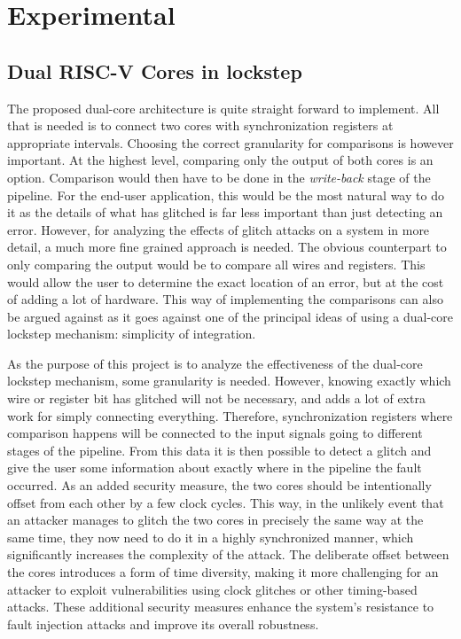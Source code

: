 \chapter{Experimental}
\label{chap4}

\section{Dual RISC-V Cores in lockstep}
\label{sec:dualcore}

The proposed dual-core architecture is quite straight forward to implement. All that is needed is to connect two cores with synchronization registers at appropriate intervals. Choosing the correct granularity for comparisons is however important. At the highest level, comparing only the output of both cores is an option. Comparison would then have to be done in the \textit{write-back} stage of the pipeline. For the end-user application, this would be the most natural way to do it as the details of what has glitched is far less important than just detecting an error. However, for analyzing the effects of glitch attacks on a system in more detail, a much more fine grained approach is needed. The obvious counterpart to only comparing the output would be to compare all wires and registers. This would allow the user to determine the exact location of an error, but at the cost of adding a lot of hardware. This way of implementing the comparisons can also be argued against as it goes against one of the principal ideas of using a dual-core lockstep mechanism: simplicity of integration. 

As the purpose of this project is to analyze the effectiveness of the dual-core lockstep mechanism, some granularity is needed. However, knowing exactly which wire or register bit has glitched will not be necessary, and adds a lot of extra work for simply connecting everything. Therefore, synchronization registers where comparison happens will be connected to the input signals going to different stages of the pipeline. From this data it is then possible to detect a glitch and give the user some information about exactly where in the pipeline the fault occurred. As an added security measure, the two cores should be intentionally offset from each other by a few clock cycles. This way, in the unlikely event that an attacker manages to glitch the two cores in precisely the same way at the same time, they now need to do it in a highly synchronized manner, which significantly increases the complexity of the attack. The deliberate offset between the cores introduces a form of time diversity, making it more challenging for an attacker to exploit vulnerabilities using clock glitches or other timing-based attacks. These additional security measures enhance the system's resistance to fault injection attacks and improve its overall robustness.

